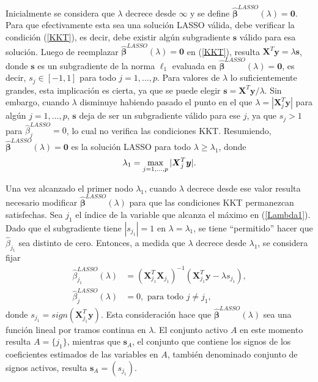 \documentclass[a4paper,12pt]{report}
\begin{document}
Inicialmente se considera que $\lambda$ decrece desde $\infty$ y se define $\boldsymbol{\hat{\beta}}^{LASSO}(\lambda)=\boldsymbol{0}$. Para que efectivamente esta sea una solución LASSO válida, debe verificar la condición (\ref{KKT}), es decir, debe existir algún subgradiente $\boldsymbol{s}$ válido para esa solución. Luego de reemplazar $\boldsymbol{\hat{\beta}}^{LASSO}(\lambda)=\boldsymbol{0}$ en (\ref{KKT}), resulta $\boldsymbol{X}^T\boldsymbol{y}=\lambda \boldsymbol{s}$, donde $\boldsymbol{s}$ es un subgradiente de la norma $\ell_1$ evaluada en $\boldsymbol{\hat{\beta}}^{LASSO}(\lambda)=\boldsymbol{0}$, es decir, $s_j \in [-1,1]$ para todo $j=1, ...,p$. Para valores de $\lambda$ lo suficientemente grandes, esta implicación es cierta, ya que se puede elegir $\boldsymbol{s}=\boldsymbol{X}^T\boldsymbol{y}/\lambda$. Sin embargo, cuando $\lambda$ disminuye habiendo pasado el punto en el que $\lambda=|\boldsymbol{X}_j^T\boldsymbol{y}|$ para algún $j=1, ...,p$, $\boldsymbol{s}$ deja de ser un subgradiente válido para ese $j$, ya que $s_j > 1$ para $\hat{\beta}_j^{LASSO}=0$, lo cual no verifica las condiciones KKT. Resumiendo, $\boldsymbol{\hat{\beta}}^{LASSO}(\lambda)=\boldsymbol{0}$ es la solución LASSO para todo $\lambda\geq \lambda_1$, donde 
\begin{equation}
\label{Lambda1}
\lambda_1=\operatornamewithlimits{max}\limits_{j=1, ...,p} |\boldsymbol{X}_j^T\boldsymbol{y}|.
\end{equation}

Una vez alcanzado el primer nodo $\lambda_1$, cuando $\lambda$ decrece desde ese valor resulta necesario modificar $\boldsymbol{\hat{\beta}}^{LASSO}(\lambda)$ para que las condiciones KKT permanezcan satisfechas. Sea $j_1$ el índice de la variable que alcanza el máximo en (\ref{Lambda1}). Dado que el subgradiente tiene $|s_{j_1}|=1$ en $\lambda=\lambda_1$, se tiene ``permitido'' hacer que $\hat{\beta}_{j_1}$ sea distinto de cero. Entonces, a medida que $\lambda$ decrece desde $\lambda_1$, se considera fijar
\begin{equation}
\label{BJ1}
\begin{aligned}
\hat{\beta}_{j_1}^{LASSO}(\lambda)&=(\boldsymbol{X}_{j_1}^T\boldsymbol{X}_{j_1})^{-1}(\boldsymbol{X}_{j_1}^T\boldsymbol{y}-\lambda s_{j_1}), \\ \hat{\beta}_j^{LASSO}(\lambda)&=0,\text{ para todo } j\neq j_1,
\end{aligned}
\end{equation}
donde $s_{j_1}=sign(\boldsymbol{X}_{j_1}^T\boldsymbol{y})$. Esta consideración hace que $\boldsymbol{\hat{\beta}}^{LASSO}(\lambda)$ sea una función lineal por tramos continua en $\lambda$. El conjunto activo $A$ en este momento resulta $A=\{j_1\}$, mientras que $\boldsymbol{s}_A$, el conjunto que contiene los signos de los coeficientes estimados de las variables en $A$, también denominado conjunto de signos activos, resulta $\boldsymbol{s}_A=(s_{j_1})$.
\end{document}
